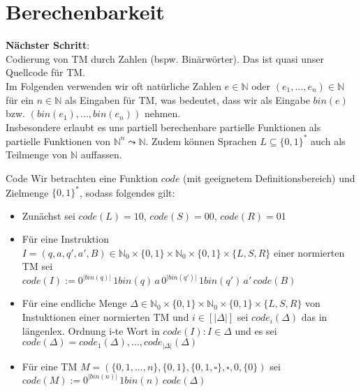 
\section{Berechenbarkeit}

\textbf{Nächster Schritt}: \\
Codierung von TM durch Zahlen (bspw. Binärwörter). Das ist quasi unser Quellcode für TM. \\
Im Folgenden verwenden wir oft natürliche Zahlen $e \in \mathbb{N}$ oder $(e_1,...,e_n) \in \mathbb{N}$ 
für ein $n \in \mathbb{N}$ als Eingaben für TM, was bedeutet, dass wir als Eingabe $bin(e)$ 
bzw. $(bin(e_1),...,bin(e_n))$ nehmen. \\

Insbesondere erlaubt es uns partiell berechenbare partielle Funktionen als partielle Funktionen von $\mathbb{N}^n \leadsto \mathbb{N}$.
Zudem können Sprachen $L \subseteq \{0,1\}^*$ auch als Teilmenge von $\mathbb{N}$ auffassen.

\begin{defn}{Code}
    Wir betrachten eine Funktion $code$ (mit geeignetem Definitionsbereich) und Zielmenge $\{0,1\}^*$, sodass folgendes gilt:
    \begin{itemize}
        \item Zunächst sei $code(L)=10$, $code(S)=00$, $code(R)=01$
        \item Für eine Instruktion $I = (q,a,q',a',B) \in \mathbb{N}_0 \times \{0,1\} \times \mathbb{N}_0 \times \{0,1\} \times \{L,S,R\}$
              einer normierten TM sei \\
              $code(I) := 0^{\vert bin(q) \vert} \, 1bin(q) \, a \, 0^{\vert bin(q')\vert} \, 1bin(q') \, a' \, code(B)$
        \item Für eine endliche Menge $\Delta \in \mathbb{N}_0 \times \{0,1\} \times \mathbb{N}_0 \times \{0,1\} \times \{L,S,R\}$ von Instuktionen einer
              normierten TM und $i \in [\vert \Delta \vert]$ sei $code_i(\Delta)$ das in längenlex. Ordnung i-te Wort in 
              $code(I) : I \in \Delta$ und es sei $code(\Delta) = code_1(\Delta),...,code_{\vert \Delta \vert}(\Delta)$
        \item Für eine TM $M= (\{0,1,...,n\},\{0,1\},\{0,1,\square\},\square,0,\{0\})$ sei \\
              $code(M) := 0^{\vert bin(n) \vert} \, 1bin(n) \, code(\Delta)$ 
    \end{itemize}
\end{defn}

